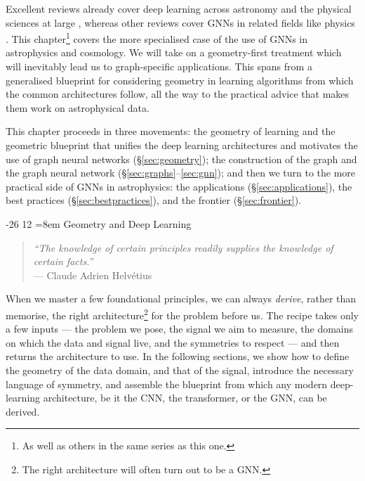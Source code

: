 \documentclass[graybox, envcountchap]{Template/svmult}
\makeatletter
\newif\ifarxiv
\newcommand{\chapterorreview}{\ifarxiv review\else chapter\fi}%
\renewcommand\section{\@startsection{section}{1}{\z@}%
                       {-26\p@}%
                       {12\p@}%
                       {\normalfont\secsize\secstyle
                        \rightskip=\z@ \@plus 8em\pretolerance=10000 }}
\makeatother
\begin{document}
Excellent reviews already cover deep learning across astronomy and the physical sciences at large \citep{HuertasCompany2023_dawes_review, Ferguson2025_AI_physicalsciences, Ting2026_deeplearning_review}, whereas other reviews cover GNNs in related fields like physics \citep{Shlomi2021_particlephysics_review}. This \chapterorreview{}\footnote{As well as others in the same series as this one.} covers the more specialised case of the use of GNNs in astrophysics and cosmology. We will take on a geometry-first treatment which will inevitably lead us to graph-specific applications. This spans from a generalised blueprint for considering geometry in learning algorithms from which the common architectures follow, all the way to the practical advice that makes them work on astrophysical data.

This \chapterorreview{} proceeds in three movements: the geometry of learning and the geometric blueprint that unifies the deep learning architectures and motivates the use of graph neural networks (\S\ref{sec:geometry}); the construction of the graph and the graph neural network (\S\ref{sec:graphs}--\ref{sec:gnn}); and then we turn to the more practical side of GNNs in astrophysics: the applications (\S\ref{sec:applications}), the best practices (\S\ref{sec:bestpractices}), and the frontier (\S\ref{sec:frontier}).




\section{Geometry and Deep Learning}
\label{sec:geometry}

\begin{quotation}
\noindent\textit{``The knowledge of certain principles readily supplies the knowledge of certain facts.''} \\
\noindent\hfill --- Claude Adrien Helv\'etius
\end{quotation}

When we master a few foundational principles, we can always \emph{derive}, rather than memorise, the right architecture\footnote{The right architecture will often turn out to be a GNN.} for the problem before us. The recipe takes only a few inputs --- the problem we pose, the signal we aim to measure, the domains on which the data and signal live, and the symmetries to respect --- and then returns the architecture to use. In the following sections, we show how to define the geometry of the data domain, and that of the signal, introduce the necessary language of symmetry, and assemble the blueprint from which any modern deep-learning architecture, be it the CNN, the transformer, or the GNN, can be derived.
\end{document}
